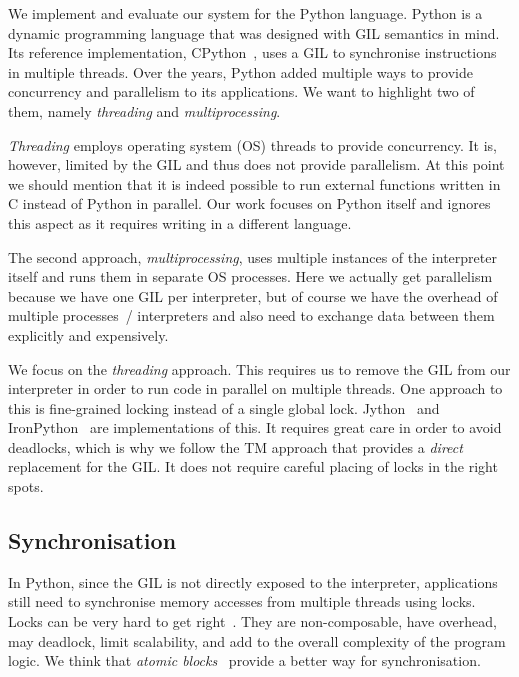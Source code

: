 \documentclass{sigplanconf}
\begin{document}
We implement and evaluate our system for the Python language. Python
is a dynamic programming language that was designed with GIL semantics
in mind. Its reference implementation, CPython~\cite{cpython}, uses a
GIL to synchronise instructions in multiple threads.
Over the years, Python added multiple ways to provide concurrency and
parallelism to its applications. We want to highlight two of them,
namely \emph{threading} and \emph{multiprocessing}.

\emph{Threading} employs operating system (OS) threads to provide
concurrency. It is, however, limited by the GIL and thus does not
provide parallelism. At this point we should mention that it is indeed
possible to run external functions written in C instead of Python in
parallel. Our work focuses on Python itself and ignores this aspect as
it requires writing in a different language.

The second approach, \emph{multiprocessing}, uses multiple instances
of the interpreter itself and runs them in separate OS processes.
Here we actually get parallelism because we have one GIL per
interpreter, but of course we have the overhead of multiple processes~/
interpreters and also need to exchange data between them explicitly
and expensively.

We focus on the \emph{threading} approach. This requires us to remove
the GIL from our interpreter in order to run code in parallel on
multiple threads. One approach to this is fine-grained locking instead
of a single global lock. Jython~\cite{webjython} and
IronPython~\cite{ironpython} are implementations of this. It requires
great care in order to avoid deadlocks, which is why we follow the TM
approach that provides a \emph{direct} replacement for the GIL. It
does not require careful placing of locks in the right spots.


\subsection{Synchronisation}

In Python, since the GIL is not directly exposed to the interpreter,
applications still need to synchronise memory accesses from multiple
threads using locks. Locks can be very hard to get
right~\cite{christopher10,victor11,shan08}.  They are non-composable,
have overhead, may deadlock, limit scalability, and add to the overall
complexity of the program logic. We think that \emph{atomic
blocks}~\cite{tim03,tim05} provide a better way for synchronisation.
\end{document}
